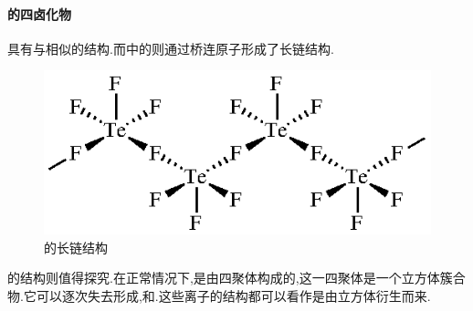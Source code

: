 \documentclass{ctexart}
\begin{document}
\paragraph{的四卤化物}
具有与相似的结构.而中的则通过桥连原子形成了长链结构.
\begin{figure}[H]
    \centering\includegraphics{picture/TeF4.eps}
    \caption{的长链结构}
\end{figure}
的结构则值得探究.在正常情况下,是由四聚体构成的,这一四聚体是一个立方体簇合物.它可以逐次失去形成,和.这些离子的结构都可以看作是由立方体衍生而来.
\end{document}
